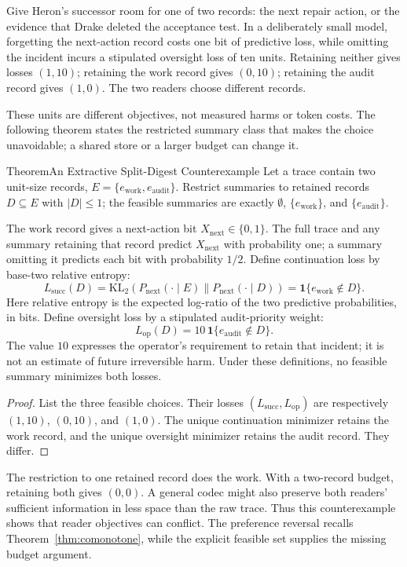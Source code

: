 \documentclass[11pt,a4paper]{article}
\theoremstyle{definition}
\theoremstyle{plain}
\begin{document}
Give Heron's successor room for one of two records: the next repair action,
or the evidence that Drake deleted the acceptance test. In a deliberately small
model, forgetting the next-action record costs one bit of predictive loss, while
omitting the incident incurs a stipulated oversight loss of ten units. Retaining
neither gives losses $(1,10)$; retaining the work record gives $(0,10)$; retaining
the audit record gives $(1,0)$. The two readers choose different records.

These units are different objectives, not measured harms or token costs. The
following theorem states the restricted summary class that makes the choice
unavoidable; a shared store or a larger budget can change it.

\begin{pdclaim}{Theorem}{An Extractive Split-Digest Counterexample}
\label{thm:split-digest}
Let a trace contain two unit-size records, $E=\{e_{\mathrm{work}},e_{\mathrm{audit}}\}$. Restrict summaries to retained records $D\subseteq E$ with $|D|\le1$; the feasible summaries are exactly $\emptyset$, $\{e_{\mathrm{work}}\}$, and $\{e_{\mathrm{audit}}\}$.

The work record gives a next-action bit $X_{\mathrm{next}}\in\{0,1\}$. The full trace and any summary retaining that record predict $X_{\mathrm{next}}$ with probability one; a summary omitting it predicts each bit with probability $1/2$. Define continuation loss by base-two relative entropy:
\[
L_{\mathrm{succ}}(D)=\mathrm{KL}_2(P_{\mathrm{next}}(\cdot\mid E)\|P_{\mathrm{next}}(\cdot\mid D))
=\mathbf1\{e_{\mathrm{work}}\notin D\}.
\]
Here relative entropy is the expected log-ratio of the two predictive probabilities, in bits. Define oversight loss by a stipulated audit-priority weight:
\[
L_{\mathrm{op}}(D)=10\,\mathbf1\{e_{\mathrm{audit}}\notin D\}.
\]
The value $10$ expresses the operator's requirement to retain that incident; it is not an estimate of future irreversible harm. Under these definitions, no feasible summary minimizes both losses.
\end{pdclaim}

\begin{proof}
List the three feasible choices. Their losses $(L_{\mathrm{succ}},L_{\mathrm{op}})$ are respectively $(1,10)$, $(0,10)$, and $(1,0)$. The unique continuation minimizer retains the work record, and the unique oversight minimizer retains the audit record. They differ.
\end{proof}

\noindent The restriction to one retained record does the work. With a two-record budget, retaining both gives $(0,0)$. A general codec might also preserve both readers' sufficient information in less space than the raw trace. Thus this counterexample shows that reader objectives can conflict.
\noindent The preference reversal recalls Theorem~\ref{thm:comonotone}, while the explicit feasible set supplies the missing budget argument.
\end{document}
